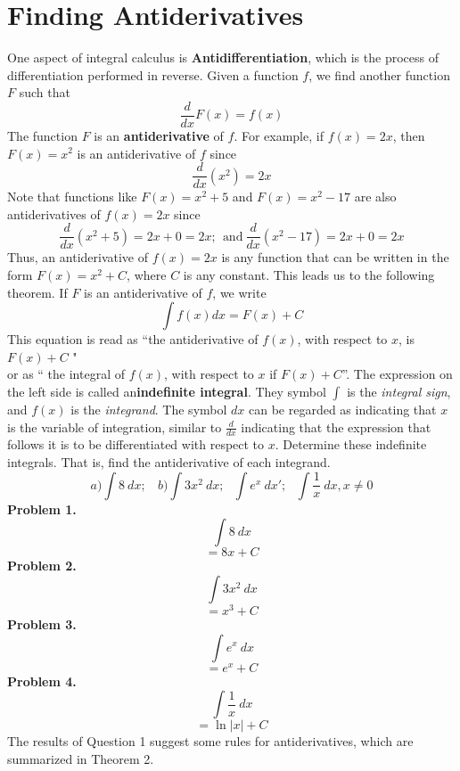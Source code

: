 \documentclass{report}
\begin{document}
\section*{Finding Antiderivatives}
One aspect of integral calculus is \textbf{Antidifferentiation}, which is the process of differentiation performed in reverse. Given a function $f$, we find another function $F$ such that
$$ \frac{d}{dx}F(x) = f(x)$$
The function $F$ is an \textbf{antiderivative} of $f$. For example, if $f(x) = 2x$, then $F(x) = x^2$ is an antiderivative of $f$ since
$$ \frac{d}{dx}(x^2) = 2x$$
Note that functions like $F(x) = x^2 +5$ and $F(x) = x^2 - 17$ are also antiderivatives of $f(x) = 2x$ since
$$ \frac{d}{dx}(x^2+5)=2x+0 =2x; \ \ \text{and} \ \frac{d}{dx}(x^2-17) = 2x+0=2x$$
Thus, an antiderivative of $f(x) =2x$ is any function that can be written in the form $F(x)=x^2+C$, where $C$ is any constant. This leads us to the following theorem.
\bigbreak \noindent
{}
\bigbreak \noindent \bigbreak \noindent
If $F$ is an antiderivative of $f$, we write
$$ \int f(x)dx =F(x)+C$$
This equation is read as ``the antiderivative of $f(x)$, with respect to $x$, is $F(x) +C$ " \\
or as `` the integral of $f(x)$, with respect to $x$ if $F(x) +C$''. The expression on the left side is called an\textbf{indefinite integral}. They symbol $\int$ is the \textit{integral sign}, and $f(x)$ is the \textit{integrand}. The symbol $dx$ can be regarded as indicating that $x$ is the variable of integration, similar to $ \frac{d}{dx}$ indicating that the expression that follows it is to be differentiated with respect to $x$.
\newpage
\q
Determine these indefinite integrals. That is, find the antiderivative of each integrand.
$$ a) \int{8}\ dx; \ \ \ \ b) \int{3x^2}\ dx; \ \ \ \int{e^x}\ dx'; \ \ \ \int{\dfrac{1}{x}}\ dx, x \neq 0$$
\bigbreak \noindent
\textbf{Problem 1.} 
$$\int{8}\ dx$$
$$ = 8x +C$$
\bigbreak \noindent
\textbf{Problem 2.}
$$ \int{3x^2}\ dx$$
$$ = x^3+C$$
\bigbreak \noindent
\textbf{Problem 3.}
$$ \int{e^x}\ dx$$
$$ = e^x +C$$
\bigbreak \noindent
\textbf{Problem 4.}
$$\int{\dfrac{1}{x}}\ dx$$
$$ = \ln{\lvert x\rvert} + C$$
\bigbreak \noindent
{}
\bigbreak \noindent \bigbreak \noindent
The results of Question 1 suggest some rules for antiderivatives, which are summarized in Theorem 2.
\bigbreak \noindent
{}
\end{document}
